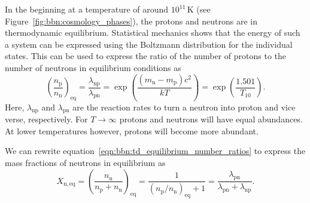 In the beginning at a temperature of around $10^{11}$\,K (see Figure~\ref{fig:bbn:cosmology_phases}), the protons and neutrons are in thermodynamic equilibrium. Statistical mechanics shows that the energy of such a system can be expressed using the Boltzmann distribution for the individual states. This can be used to express the ratio of the number of protons to the number of neutrons in equilibrium conditions as
\begin{equation}\label{eqn:bbn:td_equilibrium_number_ratios}
    \left(\frac{n_\mathrm{p}}{n_\mathrm{n}}\right)_\mathrm{eq} 
        = \frac{\lambda_\mathrm{np}}{\lambda_\mathrm{pn}}
        = \exp\left(\frac{(m_\mathrm{n} - m_\mathrm{p})c^2}{kT}\right)
        = \exp\left(\frac{1.501}{T_{10}}\right).
\end{equation}
Here, $\lambda_\mathrm{np}$ and $\lambda_\mathrm{pn}$ are the reaction rates to turn a neutron into proton and vice verse, respectively. For $T\rightarrow\infty$ protons and neutrons will have equal abundances. At lower temperatures however, protons will become more abundant. 

We can rewrite equation~\eqref{eqn:bbn:td_equilibrium_number_ratios} to express the mass fractions of neutrons in equilibrium as
\begin{equation}
    X_\mathrm{n,eq} = \left(\frac{n_\mathrm{n}}{n_\mathrm{p} + n_\mathrm{n}}\right)_\mathrm{eq}
    = \frac{1}{(n_\mathrm{p} / n_\mathrm{n})_\mathrm{eq} + 1}
    = \frac{\lambda_\mathrm{pn}}{\lambda_\mathrm{pn} + \lambda_\mathrm{np}}.
\end{equation}


